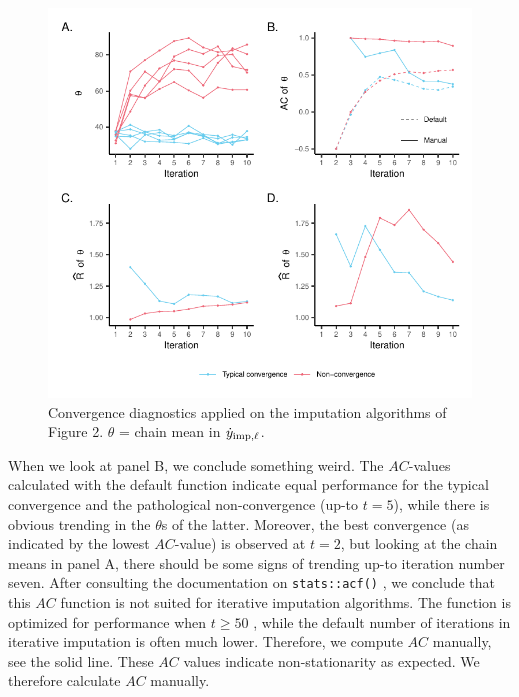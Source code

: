 \documentclass[Royal,times,sageh]{sagej}
\begin{document}
\begin{figure}

{\centering \includegraphics{2.Manuscript_files/figure-latex/diagnostics-1} 

}

\caption{Convergence diagnostics applied on the imputation algorithms of Figure 2. $\theta$ = chain mean in $ \dot y_{\rm imp, \ell} $.}\label{fig:diagnostics}
\end{figure}

When we look at panel B, we conclude something weird. The \(AC\)-values calculated with the default function indicate equal performance for the typical convergence and the pathological non-convergence (up-to \(t=5\)), while there is obvious trending in the \(\theta\)s of the latter. Moreover, the best convergence (as indicated by the lowest \(AC\)-value) is observed at \(t=2\), but looking at the chain means in panel A, there should be some signs of trending up-to iteration number seven. After consulting the documentation on \texttt{stats::acf()} \citep{R}, we conclude that this \(AC\) function is not suited for iterative imputation algorithms. The function is optimized for performance when \(t\geq50\) \citep{box15}, while the default number of iterations in iterative imputation is often much lower. Therefore, we compute \(AC\) manually, see the solid line. These \(AC\) values indicate non-stationarity as expected. We therefore calculate \(AC\) manually.
\end{document}
